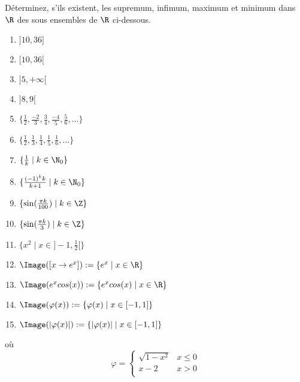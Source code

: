 
\begin{exercice}\label{exo0001}

Déterminez, s'ils existent, les supremum, infimum, maximum et minimum dans $\R$ des sous ensembles de $\R$ ci-dessous.
\begin{multicols}{2}
\begin{enumerate}
\item $]10,36] $
\item $[10,36[ $
\item $]5,+\infty[ $
\item $]8,9[ $
\item $\{ \frac{1}{2}, \frac{-2}{3}, \frac{3}{4}, \frac{-4}{5},  \frac{5}{6}, ... \} $
\item $\{ \frac{1}{2}, \frac{1}{3}, \frac{1}{4}, \frac{1}{5},  \frac{1}{6}, ... \} $
\item\label{itemexo1g} $\{ \frac{1}{k} \mid k \in \N_0 \} $
\item\label{itemexo1h} $\{ \frac{(-1)^k k}{k+1} \mid k \in \N_0 \} $
\item $\{ \sin(\frac{\pi k}{100}) \mid k \in \Z \} $
\item $\{ \sin(\frac{\pi k}{3}) \mid k \in \Z \} $
\item\label{itemexo1k}  $\{ x^2 \mid x\in ]-1,\frac{1}{2} [ \} $
\item $\Image([x \rightarrow e^x]) := \{ e^x \mid x\in \R \}$
\item $\Image(e^x cos(x)) := \{ e^x cos(x) \mid x\in \R \} $
\item $\Image(\varphi(x)) := \{ \varphi(x) \mid x \in [-1,1] \} $
\item $\Image( |\varphi(x)| ) := \{  |\varphi(x)| \mid x \in [-1,1] \} $
\end{enumerate}
\end{multicols}
où
\[
\varphi= \left\{ \begin{array}{ll} \sqrt{1-x^2} & x \leq 0 \\ x-2 & x>0 \\ \end{array} \right.
\]

\end{exercice}
